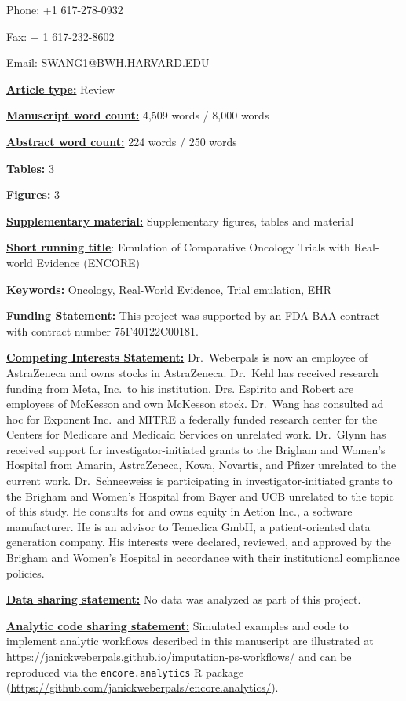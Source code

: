 \documentclass[
  letterpaper,
  DIV=11,
  numbers=noendperiod]{scrartcl}
\begin{document}
Phone: +1 617-278-0932

Fax: + 1 617-232-8602

Email: \url{SWANG1@BWH.HARVARD.EDU}

\ul{\textbf{Article type:}} Review

\ul{\textbf{Manuscript word count:}} 4,509 words / 8,000 words

\ul{\textbf{Abstract word count:}} 224 words / 250 words

\ul{\textbf{Tables:}} 3

\ul{\textbf{Figures:}} 3

\ul{\textbf{Supplementary material:}} Supplementary figures, tables and
material

\ul{\textbf{Short running title}}: Emulation of Comparative Oncology
Trials with Real-world Evidence (ENCORE)

\ul{\textbf{Keywords:}} Oncology, Real-World Evidence, Trial emulation,
EHR

\ul{\textbf{Funding Statement:}} This project was supported by an FDA
BAA contract with contract number 75F40122C00181.

\ul{\textbf{Competing Interests Statement:}} Dr.~Weberpals is now an
employee of AstraZeneca and owns stocks in AstraZeneca. Dr.~Kehl has
received research funding from Meta, Inc.~to his institution. Drs.
Espirito and Robert are employees of McKesson and own McKesson stock.
Dr.~Wang has consulted ad hoc for Exponent Inc.~and MITRE a federally
funded research center for the Centers for Medicare and Medicaid
Services on unrelated work. Dr.~Glynn has received support for
investigator-initiated grants to the Brigham and Women's Hospital from
Amarin, AstraZeneca, Kowa, Novartis, and Pfizer unrelated to the current
work. Dr.~Schneeweiss is participating in investigator-initiated grants
to the Brigham and Women's Hospital from Bayer and UCB unrelated to the
topic of this study. He consults for and owns equity in Aetion Inc., a
software manufacturer. He is an advisor to Temedica GmbH, a
patient-oriented data generation company. His interests were declared,
reviewed, and approved by the Brigham and Women's Hospital in accordance
with their institutional compliance policies.

\ul{\textbf{Data sharing statement:}} No data was analyzed as part of
this project.

\ul{\textbf{Analytic code sharing statement:}} Simulated examples and
code to implement analytic workflows described in this manuscript are
illustrated at
\url{https://janickweberpals.github.io/imputation-ps-workflows/} and can
be reproduced via the \texttt{encore.analytics} R package
(\url{https://github.com/janickweberpals/encore.analytics/}).
\end{document}
